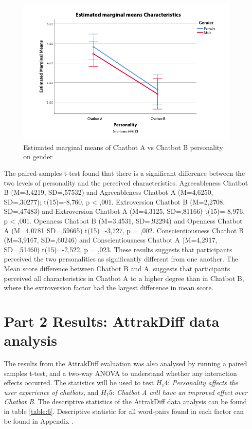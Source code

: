 \begin{figure}[H]
    \centering
    \includegraphics[scale=0.4]{figures/pers-char-gender.png}
    \caption{Estimated marginal means of Chatbot A vs Chatbot B personality on gender}
    \label{fig:perschargender}
\end{figure}

The paired-samples t-test found that there is a significant difference between the two levels of personality and the perceived characteristics. Agreeableness Chatbot B (M=3,4219, SD=,57532) and Agreeableness Chatbot A (M=4,6250, SD=,30277); t(15)=-8,760, p < ,001. Extroversion Chatbot B (M=2,2708, SD=,47483) and Extroversion Chatbot A (M=4,3125, SD=,81166) t(15)=-8,976, p < ,001. Openness Chatbot B (M=3,4531, SD=,92294) and Openness Chatbot A (M=4,0781 SD=,59665) t(15)=-3,727, p = ,002. Conscientiousness Chatbot B (M=3,9167, SD=,60246) and Conscientiousness Chatbot A (M=4,2917, SD=,51460) t(15)=-2,522, p = ,023. These results suggests that participants perceived the two personalities as significantly different from one another. The Mean score difference between Chatbot B and A, suggests that participants perceived all characteristics in Chatbot A to a higher degree than in Chatbot B, where the extroversion factor had the largest difference in mean score.

\section{Part 2 Results: AttrakDiff data analysis }
        
The results from the AttrakDiff evaluation was also analysed by running a paired samples t-test, and a two-way ANOVA to understand whether any interaction effects occurred. The statistics will be used to test $H_1 4$: \textit{Personality affects the user experience of chatbots}, and $H_1 5$: \textit{Chatbot A will have an improved effect over Chatbot B}. The descriptive statistics of the AttrakDiff data analysis can be found in table \ref{table:6}. Descriptive statistic for all word-pairs found in each factor can be found in Appendix .

